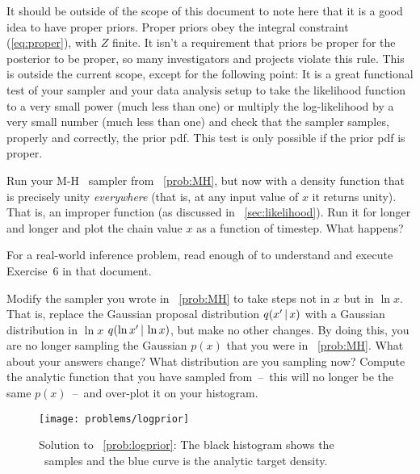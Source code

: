 \documentclass[modern]{aastex61}
\newcommand{\MCMC}{\acronym{MCMC}}
\begin{document}
It should be outside of the scope of this document to note here that
it is a good idea to have proper priors.
Proper priors obey the integral constraint (\ref{eq:proper}),
with $Z$ finite.
It isn't a requirement that priors be proper for the posterior to
be proper, so many investigators and projects violate this rule.
This is outside the current scope, except for the following point:
It is a great functional test of your sampler and your data analysis
setup to take the likelihood function to a very small power (much less
than one) or multiply the log-likelihood by a very small number (much
less than one) and check that the sampler samples, properly and
correctly, the prior pdf.
This test is only possible if the prior pdf is proper.

\begin{problem}\label{prob:improper}
Run your M-H \MCMC\ sampler from \problemname~\ref{prob:MH}, but now
with a density function that is precisely unity \emph{everywhere}
(that is, at any input value of $x$ it returns unity).  That is, an
improper function (as discussed in \sectionname~\ref{sec:likelihood}).
Run it for longer and longer and plot the chain value $x$ as a
function of timestep.  What happens?
\end{problem}

\begin{problem}\label{prob:fittingaline}
For a real-world inference problem, read enough of
\citet{fittingaline} to understand and execute Exercise~6 in that
document.
\end{problem}

\begin{problem}\label{prob:logprior}
Modify the sampler you wrote in \problemname~\ref{prob:MH} to take
steps not in $x$ but in $\ln x$.  That is, replace the Gaussian
proposal distribution $q(x'\,|\, x)$ with a Gaussian distribution in
$\ln x$ $q(\ln x'\,|\, \ln x)$, but make no other changes.
By doing this, you are no longer sampling the Gaussian $p(x)$ that you were in
\problemname~\ref{prob:MH}.
What about your answers change?  What distribution are you sampling now?
Compute the analytic function that you have sampled from~--~this will no longer
be the same $p(x)$~--~and over-plot it on your histogram.
\end{problem}

\begin{figure}[!htbp]
\begin{center}
\texttt{[image: problems/logprior]}
\end{center}
\caption{Solution to \problemname~\ref{prob:logprior}:
The black histogram shows the \MCMC\ samples and the blue curve is the analytic
target density.}
\label{fig:logprior}
\end{figure}
\end{document}
